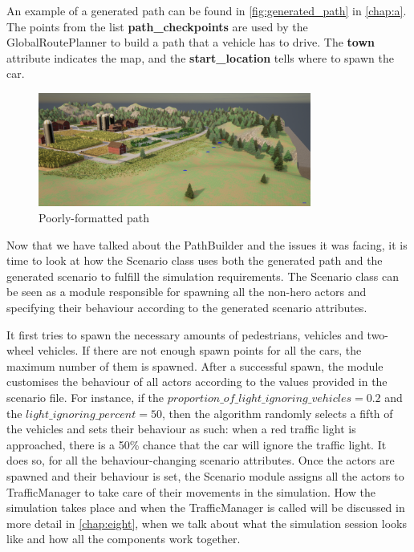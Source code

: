 An example of a generated path can be found in \autoref{fig:generated_path} in \autoref{chap:a}. The points from the list \textbf{path\_checkpoints} are used by the GlobalRoutePlanner to build a path that a vehicle has to drive. The \textbf{town} attribute indicates the map, and the \textbf{start\_location} tells where to spawn the car.

\begin{figure}
    \centering
    \includegraphics[width = 0.8\textwidth]{research_paper/Images/wrong_path.png}
    \caption{Poorly-formatted path}
    \label{fig:wrong_path}
\end{figure}

Now that we have talked about the PathBuilder and the issues it was facing, it is time to look at how the Scenario class uses both the generated path and the generated scenario to fulfill the simulation requirements. The Scenario class can be seen as a module responsible for spawning all the non-hero actors and specifying their behaviour according to the generated scenario attributes.

It first tries to spawn the necessary amounts of pedestrians, vehicles and two-wheel vehicles. If there are not enough spawn points for all the cars, the maximum number of them is spawned. After a successful spawn, the module customises the behaviour of all actors according to the values provided in the scenario file. For instance, if the $proportion\_of\_light\_ignoring\_vehicles = 0.2$ and the $light\_ignoring\_percent = 50$, then the algorithm randomly selects a fifth of the vehicles and sets their behaviour as such: when a red traffic light is approached, there is a 50\% chance that the car will ignore the traffic light. It does so, for all the behaviour-changing scenario attributes. Once the actors are spawned and their behaviour is set, the Scenario module assigns all the actors to TrafficManager to take care of their movements in the simulation. How the simulation takes place and when the TrafficManager is called will be discussed in more detail in \autoref{chap:eight}, when we talk about what the simulation session looks like and how all the components work together.

